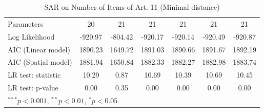 \begin{table}[!h]
\begin{center}
\begin{tabular}{l c c c c c c }
Parameters              & 20           & 21           & 21           & 21           & 21           & 21           \\
Log Likelihood          & -920.97      & -804.42      & -920.17      & -920.14      & -920.49      & -920.87      \\
AIC (Linear model)      & 1890.23      & 1649.72      & 1891.03      & 1890.66      & 1891.67      & 1892.19      \\
AIC (Spatial model)     & 1881.94      & 1650.84      & 1882.33      & 1882.27      & 1882.98      & 1883.74      \\
LR test: statistic      & 10.29        & 0.87         & 10.69        & 10.39        & 10.69        & 10.45        \\
LR test: p-value        & 0.00         & 0.35         & 0.00         & 0.00         & 0.00         & 0.00         \\
\bottomrule
\multicolumn{7}{l}{\scriptsize{$^{***}p<0.001$, $^{**}p<0.01$, $^*p<0.05$}}
\end{tabular}
\caption{SAR on Number of Items of Art. 11 (Minimal distance)}
\label{table:coefficients}
\end{center}
\end{table}
